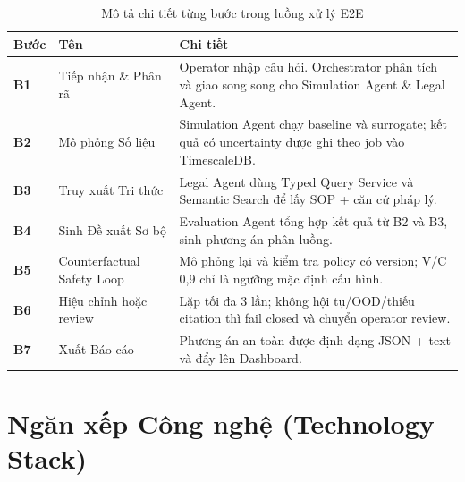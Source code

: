 \begin{table}[H]
\centering
\caption{Mô tả chi tiết từng bước trong luồng xử lý E2E}
\label{tab:workflow}
\renewcommand{\arraystretch}{1.4}
\begin{tabular}{>{\bfseries\centering}p{1.5cm} p{4cm} p{6.5cm}}
\toprule
\textbf{Bước} & \textbf{Tên} & \textbf{Chi tiết} \\
\midrule
B1 & Tiếp nhận \& Phân rã & Operator nhập câu hỏi. Orchestrator phân tích và giao song song cho Simulation Agent \& Legal Agent. \\
\rowcolor{rowgray}
B2 & Mô phỏng Số liệu & Simulation Agent chạy baseline và surrogate; kết quả có uncertainty được ghi theo job vào TimescaleDB. \\
B3 & Truy xuất Tri thức & Legal Agent dùng Typed Query Service và Semantic Search để lấy SOP + căn cứ pháp lý. \\
\rowcolor{rowgray}
B4 & Sinh Đề xuất Sơ bộ & Evaluation Agent tổng hợp kết quả từ B2 và B3, sinh phương án phân luồng. \\
B5 & Counterfactual Safety Loop & Mô phỏng lại và kiểm tra policy có version; V/C 0,9 chỉ là ngưỡng mặc định cấu hình. \\
\rowcolor{rowgray}
B6 & Hiệu chỉnh hoặc review & Lặp tối đa 3 lần; không hội tụ/OOD/thiếu citation thì fail closed và chuyển operator review. \\
B7 & Xuất Báo cáo & Phương án an toàn được định dạng JSON + text và đẩy lên Dashboard. \\
\bottomrule
\end{tabular}
\end{table}

\section{Ngăn xếp Công nghệ (Technology Stack)}

